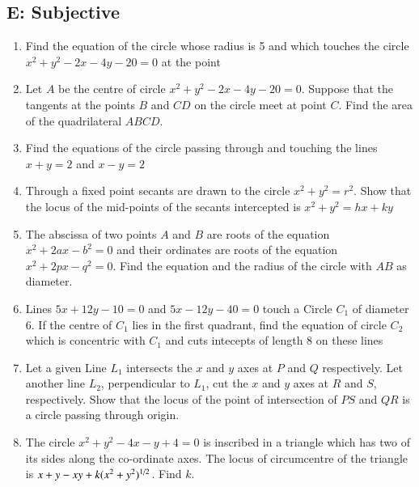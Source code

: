 \documentclass[journal,12pt,twocolumn]{IEEEtran}
\theoremstyle{remark}
\begin{document}
\subsection*{E: Subjective}
\begin{enumerate}
\item Find the equation of the circle whose radius is 5 and which touches the circle $x^2+y^2-2x-4y-20=0$ at the point 

\hfill {}
\item Let $\textit{A}$ be the centre of circle $x^2+y^2-2x-4y-20=0$. Suppose that the tangents at the points $\textit{B}$ and $\textit{CD}$  on the circle meet at point $\textit{C}$. Find the area of the quadrilateral $ABCD$.

\hfill {}
\item Find the equations of the circle passing through  and touching the lines $x+y=2$ and $x-y=2$

\hfill {}
\item Through a fixed point  secants are drawn to the circle $x^2+y^2=r^2$. Show that the locus of the mid-points of the secants intercepted is $x^2+y^2=hx+ky$

\hfill {}
\item The abscissa of two points $\textit{A}$ and $\textit{B}$ are roots of the equation $x^2+2ax-b^2=0$ and their ordinates are roots of the equation $x^2+2px-q^2=0$. Find the equation and the radius of the circle with $\textit{AB}$ as diameter.

\hfill {}
\item Lines $5x+12y-10=0$ and $5x-12y-40=0$ touch a Circle \textit{$C_1$} of diameter 6. If the centre of \textit{$C_1$} lies in the first quadrant, find the equation of circle \textit{$C_2$} which is concentric with \textit{$C_1$} and cuts intecepts of length 8 on these lines

\hfill {}
\item Let a given Line \textit{$L_1$} intersects the $x$ and $y$ axes at \textit{$P$} and \textit{$Q$} respectively. Let another line \textit{$L_2$}, perpendicular to \textit{$L_1$}, cut the $x$ and $y$ axes at \textit{$R$} and \textit{$S$}, respectively. Show that the locus of the point of intersection of \textit{$PS$} and \textit{$QR$} is a circle passing through origin.

\hfill {}
\item The circle $x^2+y^2-4x-y+4=0$ is inscribed in a triangle which has two of its sides along the co-ordinate axes. The locus of circumcentre of the triangle is $x+y-xy+k(x^2+y^2)\textsuperscript{1/2}$. Find $\textit{k}$.


\end{enumerate}
\end{document}
